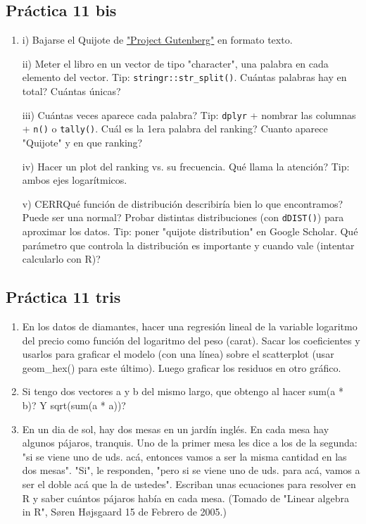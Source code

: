 \documentclass[11pt]{article}
\begin{document}
\subsection*{Práctica 11 bis}
\label{sec:orgda154cb}
\begin{enumerate}
\item i)  Bajarse el Quijote de \href{http://www.gutenberg.org}{"Project Gutenberg"} en formato texto.

ii) Meter el libro en un vector de tipo "character", una palabra en cada elemento del
vector. Tip: \texttt{stringr::str\_split()}. Cuántas palabras hay en total? Cuántas únicas?

iii) Cuántas veces aparece cada palabra? Tip: \texttt{dplyr} + nombrar las columnas + \texttt{n()} o
\texttt{tally()}. Cuál es la 1era palabra del ranking? Cuanto aparece "Quijote" y en que ranking?

iv) Hacer un plot del ranking vs. su frecuencia. Qué llama la atención? Tip: ambos ejes logarítmicos.

v) CERRQué función de distribución describiría bien lo que encontramos? Puede ser una normal? Probar
distintas distribuciones (con \texttt{dDIST()}) para aproximar los datos. Tip: poner "quijote
distribution" en Google Scholar. Qué parámetro que controla la distribución es importante y
cuando vale (intentar calcularlo con R)?
\end{enumerate}
\subsection*{Práctica 11 tris}
\label{sec:org6b777cf}
\begin{enumerate}
\item En los datos de diamantes, hacer una regresión lineal de la variable logaritmo del precio como
función del logaritmo del peso (carat). Sacar los coeficientes y usarlos para graficar el modelo (con
una línea) sobre el scatterplot (usar geom\_hex() para este último). Luego graficar los residuos
en otro gráfico.
\item Si tengo dos vectores a y b del mismo largo, que obtengo al hacer sum(a * b)? Y sqrt(sum(a * a))?
\item En un dia de sol, hay dos mesas en un jardín inglés. En cada mesa hay algunos pájaros,
tranquis. Uno de la primer mesa les dice a los de la segunda: "si se viene uno de uds. acá,
entonces vamos a ser la misma cantidad en las dos mesas". "Si", le responden, "pero si se viene
uno de uds. para acá, vamos a ser el doble acá que la de ustedes". Escriban unas ecuaciones para
resolver en R y saber cuántos pájaros había en cada mesa. (Tomado de "Linear algebra in R", Søren Højsgaard
15 de Febrero de 2005.)
\end{enumerate}
\end{document}
